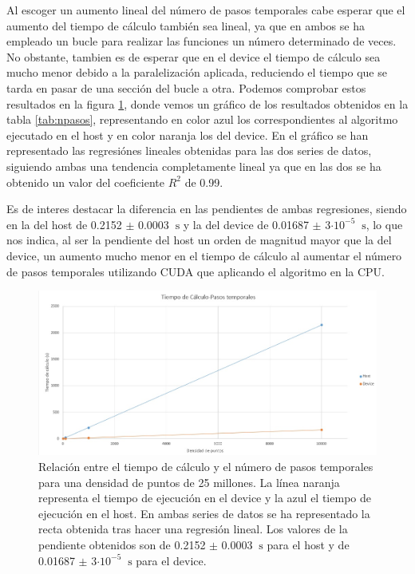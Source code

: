 \documentclass[11pt,a4paper,twoside,pdf]{article}
\numberwithin{equation}{section}
\begin{document}
Al escoger un aumento lineal del número de pasos temporales cabe esperar que el aumento del tiempo de cálculo también sea lineal, ya que en ambos se ha empleado un bucle para realizar las funciones un número determinado de veces. No obstante, tambien es de esperar que en el device el tiempo de cálculo sea mucho menor debido a la paralelización aplicada, reduciendo el tiempo que se tarda en pasar de una sección del bucle a otra. Podemos comprobar estos resultados en la figura \ref{fig:t-pasos_temporales}, donde vemos un gráfico de los resultados obtenidos en la tabla \ref{tab:npasos}, representando en color azul los correspondientes al algoritmo ejecutado en el host y en color naranja los del device. En el gráfico se han representado las regresiónes lineales obtenidas para las dos series de datos, siguiendo ambas una tendencia completamente lineal ya que en las dos se ha obtenido un valor del coeficiente $R^2$ de 0.99.

Es de interes destacar la diferencia en las pendientes de ambas regresiones, siendo en la del host de 0.2152 $\pm$ 0.0003 $\SI{}{\second}$ y la del device de 0.01687 $\pm$ 3$\cdot 10^{-5}$ $\SI{}{\second}$, lo que nos indica, al ser la pendiente del host un orden de magnitud mayor que la del device, un aumento mucho menor en el tiempo de cálculo al aumentar el número de pasos temporales utilizando CUDA que aplicando el algoritmo en la CPU.


\begin{figure}[h]
\centering
\includegraphics[width=15 cm]{T-Pasos_temporales.jpg}				
\caption{Relación entre el tiempo de cálculo y el número de pasos temporales para una densidad de puntos de 25 millones. La línea naranja representa el tiempo de ejecución en el device y la azul el tiempo de ejecución en el host. En ambas series de datos se ha representado la recta obtenida tras hacer una regresión lineal. Los valores de la pendiente obtenidos son de 0.2152 $\pm$ 0.0003 $\SI{}{\second}$ para el host y de 0.01687 $\pm$ 3$\cdot 10^{-5}$ $\SI{}{\second}$ para el device.}
\label{fig:t-pasos_temporales}
\end{figure}
\noindent
\end{document}
